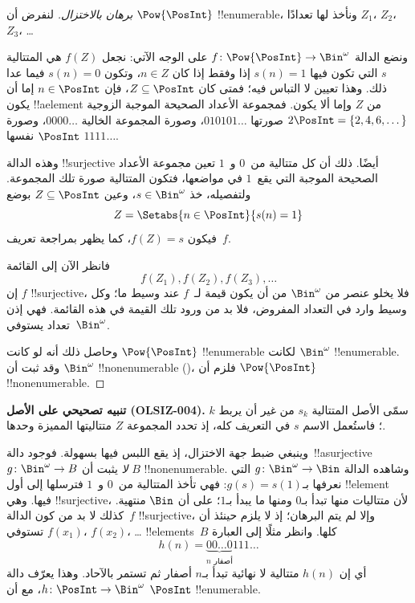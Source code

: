 \documentclass[../../../include/open-logic-section]{subfiles}
\begin{document}
\begin{proof}[برهان {} بالاختزال]
لنفرض أن $\Pow{\PosInt}$ !!{enumerable}، ونأخذ لها تعدادًا $Z_{1}$، $Z_{2}$، $Z_{3}$، \dots

ونضع الدالة $f \colon \Pow{\PosInt} \to \Bin^\omega$ على الوجه الآتي: نجعل $f(Z)$ هي المتتالية $s$ التي تكون فيها $s(n) = 1$ إذا وفقط إذا كان $n \in Z$، وتكون $s(n) = 0$ فيما عدا ذلك. وهذا تعيين لا التباس فيه؛ فمتى كان $Z \subseteq \PosInt$، فإن $n \in \PosInt$ إما أن يكون !!a{element} من $Z$ وإما ألا يكون. فمجموعة الأعداد الصحيحة الموجبة الزوجية $2\PosInt = \{2,
4, 6, \dots\}$ صورتها $010101\dots$، وصورة المجموعة الخالية $0000\dots$، وصورة $\PosInt$ نفسها $1111\dots$.

وهذه الدالة !!{surjective} أيضًا. ذلك أن كل متتالية من~$0$ و~$1$ تعين مجموعة الأعداد الصحيحة الموجبة التي يقع~$1$ في مواضعها، فتكون المتتالية صورة تلك المجموعة. ولتفصيله، خذ $s \in \Bin^\omega$، وعين $Z
\subseteq \PosInt$ بوضع
\[
Z = \Setabs{n \in \PosInt}{s(n) = 1}
\]
فيكون $f(Z) = s$، كما يظهر بمراجعة تعريف~$f$.

فانظر الآن إلى القائمة
\[
f(Z_1), f(Z_2), f(Z_3), \dots
\]
إن $f$ !!{surjective}، فلا يخلو عنصر من $\Bin^\omega$ من أن يكون قيمة لـ~$f$ عند وسيط ما؛ وكل وسيط وارد في التعداد المفروض، فلا بد من ورود تلك القيمة في هذه القائمة. فهي إذن تعداد يستوفي~$\Bin^\omega$.

وحاصل ذلك أنه لو كانت $\Pow{\PosInt}$ !!{enumerable} لكانت $\Bin^\omega$ !!{enumerable}. وقد ثبت أن $\Bin^\omega$ !!{nonenumerable} ()، فلزم أن $\Pow{\PosInt}$ !!{nonenumerable}.
\end{proof}

\begin{editorial}
\textbf{تنبيه تصحيحي على الأصل (OLSIZ-004).}
سمّى الأصل المتتالية $s_k$ من غير أن يربط $k$؛ فاستُعمل الاسم
$s$ في التعريف كله، إذ تحدد المجموعة $Z$ متتاليتها المميزة وحدها.
\end{editorial}

\begin{explain}
وينبغي ضبط جهة الاختزال، إذ يقع اللبس فيها بسهولة. فوجود دالة~!!a{surjective} $g \colon \Bin^\omega \to B$ \emph{لا} يثبت أن $B$ !!{nonenumerable}. وشاهده الدالة $g
\colon \Bin^\omega \to \Bin$ التي نعرفها بـ$g(s) = s(1)$: فهي تأخذ المتتالية من~$0$ و~$1$ فترسلها إلى أول !!{element} فيها. وهي !!{surjective}، لأن متتاليات منها تبدأ بـ$0$ ومنها ما يبدأ بـ$1$؛ على أن $\Bin$ منتهية. كذلك لا بد من كون الدالة~$f$ !!{surjective}، وإلا لم يتم البرهان؛ إذ لا يلزم حينئذ أن تستوفي $f(x_1)$، $f(x_2)$، \dots{} !!{element}s~$B$ كلها. وانظر مثلًا إلى العبارة
\[
h(n) = \underbrace{00\dots0}_{\text{$n$ أصفار}}111\dots
\]
أي إن $h(n)$ متتالية لا نهائية تبدأ بـ$n$ أصفار ثم تستمر بالآحاد.
وهذا يعرّف دالة $h\colon \PosInt \to \Bin^\omega$، مع أن
$\PosInt$ !!{enumerable}.
\end{explain}
\end{document}
